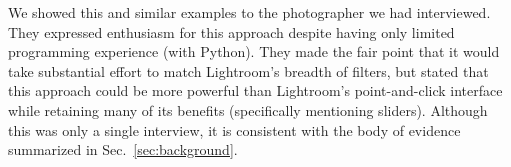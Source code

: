 We showed this and similar examples to the photographer we had interviewed.
They expressed enthusiasm for this approach despite having only
limited programming experience (with Python). They made the fair point that it
would take substantial effort to match Lightroom's breadth of filters,
but stated that this approach could be more powerful than
Lightroom's point-and-click interface while retaining many of its benefits (specifically
mentioning sliders). Although this was only a single interview,
it is consistent with the body of evidence summarized in Sec.~\ref{sec:background}.


